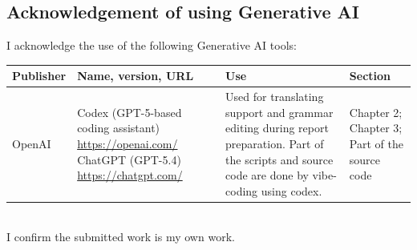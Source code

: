 \subsection*{Acknowledgement of using Generative AI}
{}
\setlength{\tabcolsep}{0.1cm} %


I acknowledge the use of the following Generative AI tools:
\begin{table}[h]
    \renewcommand{\arraystretch}{1.3}
    \small
    \begin{tabular}{|p{2.0cm}|p{3.8cm}|p{5.6cm}|p{3.5cm}|}
        \hline
        \textbf{Publisher} & \textbf{Name, version, URL} & \centering \textbf{Use} & \textbf{Section} \\
        \hline
        OpenAI & Codex (GPT-5-based coding assistant) \newline \url{https://openai.com/} 
        \newline ChatGPT (GPT-5.4) \newline
        \url{https://chatgpt.com/} & Used for translating support and grammar editing during report preparation. Part of the scripts and source code are done by vibe-coding using codex. & Chapter 2; Chapter 3; Part of the source code \\
        \hline
    \end{tabular}
\end{table}\\
I confirm the submitted work is my own work.